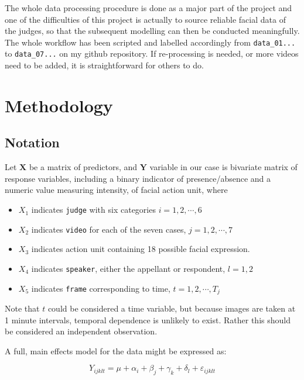 \documentclass{monashthesis}
\begin{document}
The whole data processing procedure is done as a major part of the project and one of the difficulties of this project is actually to source reliable facial data of the judges, so that the subsequent modelling can then be conducted meaningfully. The whole workflow has been scripted and labelled accordingly from \texttt{data\_01...} to \texttt{data\_07...} on my github repository. If re-processing is needed, or more videos need to be added, it is straightforward for others to do.

\hypertarget{methodology}{%
\chapter{Methodology}\label{methodology}}

\hypertarget{notation}{%
\section{Notation}\label{notation}}

Let \(\mathbf{X}\) be a matrix of predictors, and \(\mathbf{Y}\) variable in our case is bivariate matrix of response variables, including a binary indicator of presence/absence and a numeric value measuring intensity, of facial action unit, where

\begin{itemize}
\tightlist
\item
  \(X_1\) indicates \texttt{judge} with six categories \(i = 1,2, \cdots, 6\)
\item
  \(X_2\) indicates \texttt{video} for each of the seven cases, \(j = 1,2, \cdots, 7\)
\item
  \(X_3\) indicates action unit containing 18 possible facial expression.\\
\item
  \(X_4\) indicates \texttt{speaker}, either the appellant or respondent, \(l=1,2\)
\item
  \(X_5\) indicates \texttt{frame} corresponding to time, \(t = 1,2, \cdots, T_j\)
\end{itemize}

Note that \(t\) could be considered a time variable, but because images are taken at 1 minute intervals, temporal dependence is unlikely to exist. Rather this should be considered an independent observation.

A full, main effects model for the data might be expressed as:

\[Y_{ijklt} = \mu + \alpha_i + \beta_j + \gamma_k + \delta_l + \varepsilon_{ijklt}\]
\end{document}
